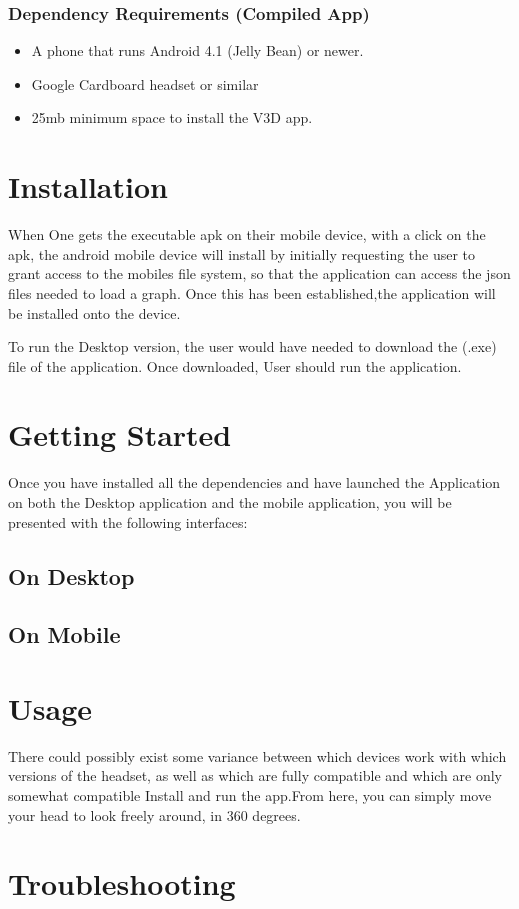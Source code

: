 \documentclass[english]{article}
\begin{document}
\subsubsection{Dependency Requirements (Compiled App)}

\begin{itemize}
   \item A phone that runs Android 4.1 (Jelly Bean) or newer.
    
   \item Google Cardboard headset or similar
    
   \item 25mb minimum space to install the V3D app. 
\end{itemize} 


\section{Installation}
When One gets the executable apk on their mobile device, with a click on the apk, the android mobile device will install by initially requesting the user to grant access to the mobiles file system, so that the application can access the json files needed to load a graph. Once this has been established,the application will be installed onto the device. 

To run the Desktop version, the user would have needed to download the (.exe) file of the application. Once downloaded, User should run the application. 
\section{Getting Started}
Once you have installed all the dependencies and have launched the Application on both the Desktop application and the mobile application, you will be presented with the following interfaces:
\subsection{On Desktop}

\subsection{On Mobile}
        

\section{Usage} 
There could possibly exist some variance between which devices work with which versions of the headset, as well as which are fully compatible and which are only somewhat compatible \newline
\newline
Install and run the app.\newline From here, you can simply move your head to look freely around, in 360 degrees.

\section{Troubleshooting}
\end{document}

